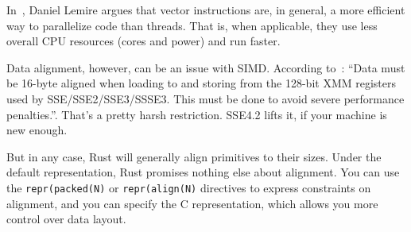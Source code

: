 \documentclass[a4paper]{report}
\begin{document}
In~\cite{lemire18:_multic_simd}, Daniel Lemire argues that vector
instructions are, in general, a more efficient way to parallelize code
than threads. That is, when applicable, they use less overall CPU
resources (cores and power) and run faster.

Data alignment, however, can be an issue with SIMD. According to~\cite{sse}: ``Data must be 16-byte aligned when loading to and storing from the 128-bit XMM registers used by SSE/SSE2/SSE3/SSSE3. This must be done to avoid severe performance penalties.''. That's a pretty harsh restriction. SSE4.2 lifts it, if your machine is new enough.

But in any case, Rust will generally align primitives to their sizes. Under the default representation, Rust promises nothing else about alignment. You can use the \texttt{repr(packed(N)} or \texttt{repr(align(N)} directives to express constraints on alignment, and you can specify the C representation, which allows you more control over data layout.



\end{document}
